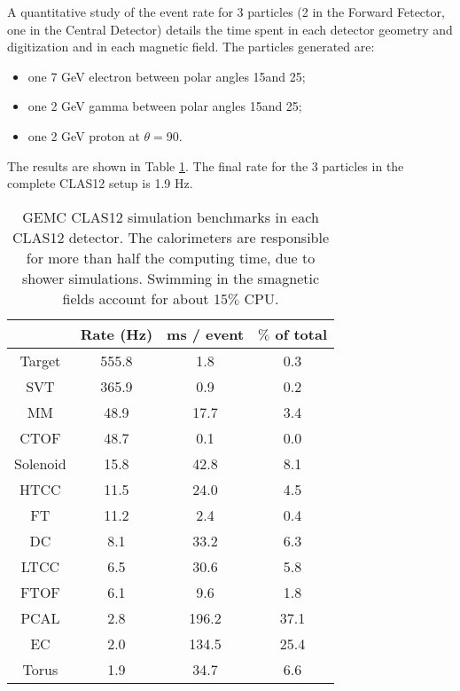 A quantitative study of the event rate for 3 particles (2 in the Forward Fetector, one in the Central Detector)
details the time spent in each detector geometry and digitization and in each magnetic field.
The particles generated are:

\begin{itemize}
	\item one 7 GeV electron between polar angles 15\mdeg and 25\mdeg;
	\item one 2 GeV gamma between polar angles 15\mdeg and 25\mdeg;
	\item one 2 GeV proton at $\theta=$90\mdeg.
\end{itemize}

The results are shown in Table \ref{tab:benchmarks}. The final rate for the 3 particles in the
complete CLAS12 setup is 1.9 Hz.

\begin{table}[h]
	\begin{center}
		\begin{tabular}{ c | c | c | c }
			 & Rate (Hz) &  ms / event &  $\%$ of total\\
			\hline
Target   &  555.8  &   1.8   & 0.3  \\
SVT      &  365.9  &   0.9   & 0.2  \\
MM       &  48.9   &   17.7  & 3.4  \\
CTOF     &  48.7   &   0.1   & 0.0  \\
Solenoid &  15.8   &   42.8  & 8.1  \\
HTCC     &  11.5   &   24.0  & 4.5  \\
FT       &  11.2   &   2.4   & 0.4  \\
DC       &  8.1    &   33.2  & 6.3  \\
LTCC     &  6.5    &   30.6  & 5.8  \\
FTOF     &  6.1    &   9.6   & 1.8  \\
PCAL     &  2.8    &   196.2 & 37.1 \\
EC       &  2.0    &   134.5 & 25.4 \\
Torus    &  1.9    &   34.7  & 6.6  \\
		\end{tabular}
	\end{center}
	\caption{GEMC CLAS12 simulation benchmarks in each CLAS12 detector. The calorimeters are responsible for more than
             half the computing time, due to shower simulations. Swimming in the smagnetic fields account for about 15$\%$ CPU.}
\label{tab:benchmarks}
\end{table}

